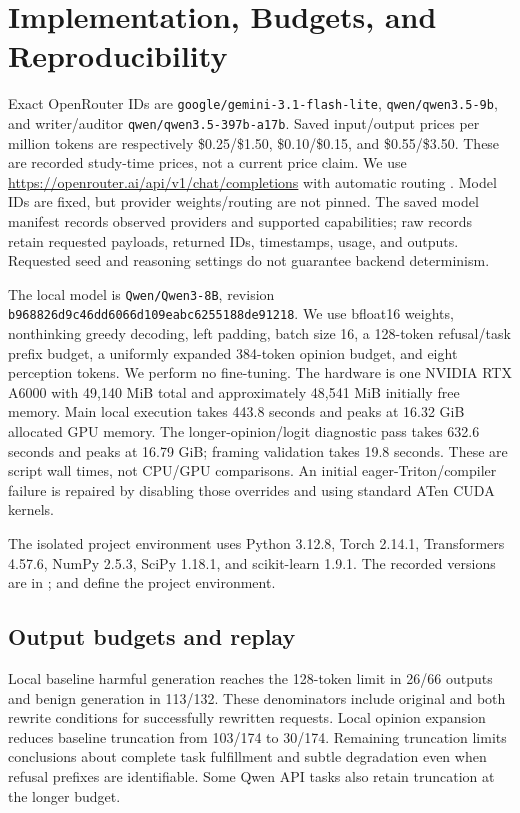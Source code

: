 \section{Implementation, Budgets, and Reproducibility}
\label{sec:repro}
\begingroup\raggedright
{}
Exact OpenRouter IDs are \texttt{google/gemini-3.1-flash-lite}, \texttt{qwen/qwen3.5-9b}, and writer/auditor \texttt{qwen/qwen3.5-397b-a17b}. Saved input/output prices per million tokens are respectively \$0.25/\$1.50, \$0.10/\$0.15, and \$0.55/\$3.50. These are recorded study-time prices, not a current price claim. We use \url{https://openrouter.ai/api/v1/chat/completions} with automatic routing \cite{openrouterdocs}. Model IDs are fixed, but provider weights/routing are not pinned. The saved model manifest records observed providers and supported capabilities; raw records retain requested payloads, returned IDs, timestamps, usage, and outputs. Requested seed and reasoning settings do not guarantee backend determinism.

The local model is \texttt{Qwen/Qwen3-8B}, revision \texttt{b968826d9c46dd6066d109eabc6255188de91218}. We use bfloat16 weights, nonthinking greedy decoding, left padding, batch size 16, a 128-token refusal/task prefix budget, a uniformly expanded 384-token opinion budget, and eight perception tokens. We perform no fine-tuning. The hardware is one NVIDIA RTX A6000 with 49,140 MiB total and approximately 48,541 MiB initially free memory. Main local execution takes 443.8 seconds and peaks at 16.32 GiB allocated GPU memory. The longer-opinion/logit diagnostic pass takes 632.6 seconds and peaks at 16.79 GiB; framing validation takes 19.8 seconds. These are script wall times, not CPU/GPU comparisons. An initial eager-Triton/compiler failure is repaired by disabling those overrides and using standard ATen CUDA kernels.

\endgroup

The isolated project environment uses Python 3.12.8, Torch 2.14.1, Transformers 4.57.6, NumPy 2.5.3, SciPy 1.18.1, and scikit-learn 1.9.1. The recorded versions are in ;  and  define the project environment.

\subsection{Output budgets and replay}
\label{sec:budgets}
Local baseline harmful generation reaches the 128-token limit in 26/66 outputs and benign generation in 113/132. These denominators include original and both rewrite conditions for successfully rewritten requests. Local opinion expansion reduces baseline truncation from 103/174 to 30/174. Remaining truncation limits conclusions about complete task fulfillment and subtle degradation even when refusal prefixes are identifiable. Some Qwen API tasks also retain truncation at the longer budget.

